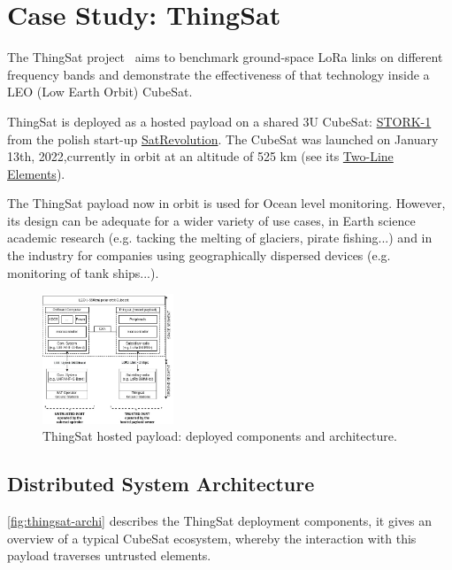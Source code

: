 \section{Case Study: ThingSat}
\label{sec:case-study}

The ThingSat project~\cite{git:thingsat-repo} aims to benchmark ground-space
LoRa links on different frequency bands and demonstrate the
effectiveness of that technology inside a LEO (Low Earth Orbit) CubeSat.

ThingSat is deployed as a hosted payload on a shared 3U CubeSat:
\href{https://space.skyrocket.de/doc_sdat/stork-1.htm}{STORK-1} from the polish
start-up \href{https://www.satrevolution.com/}{SatRevolution}. The CubeSat was
launched on January 13th, 2022,currently in orbit at an altitude of 525 km (see its
\href{https://www.n2yo.com/database/?q=STORK-1\#results}{Two-Line Elements}).

The ThingSat payload now in orbit is used for Ocean level monitoring. However,
its design can be adequate for a wider variety of use cases, in Earth science
academic research (e.g. tacking the  melting of glaciers, pirate fishing...)
and in the industry for companies using geographically dispersed devices (e.g.
monitoring of tank ships...).

\begin{figure}[t]
\centering
    \includegraphics[width=0.35\textwidth]{Figures/globecom-thingsat-mods.jpg}
    \caption{ThingSat hosted payload: deployed components and architecture.}
    \label{fig:thingsat-archi}
\end{figure}

\subsection{Distributed System Architecture}

\autoref{fig:thingsat-archi} describes the ThingSat deployment components, it gives an
overview of a typical CubeSat ecosystem, whereby the interaction with this payload
traverses untrusted elements.

